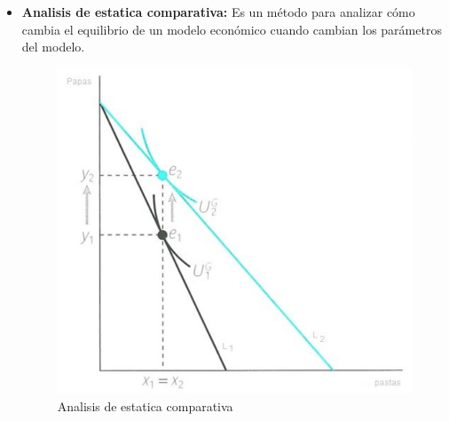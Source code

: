 \documentclass{templateNote}
\begin{document}
\begin{itemize}
    \newpage
    \item \textbf{Analisis de estatica comparativa:} Es un método para analizar cómo cambia el equilibrio de un modelo económico cuando cambian los parámetros del modelo.\\
    
    \begin{figure}[H]
        \centering
        \includegraphics[scale=0.3]{img/Analisis.png}
        \caption{Analisis de estatica comparativa}
    \end{figure}


\end{itemize}
\end{document}
